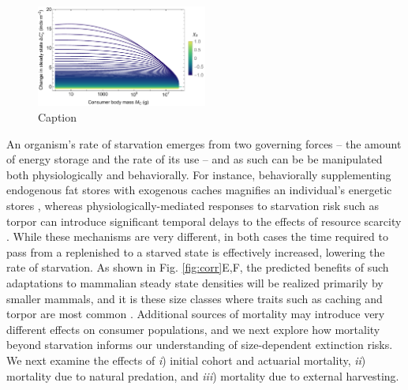 \documentclass[11pt]{article}
\begin{document}
\begin{figure}[h!]
    \centering
    \includegraphics[width=0.5\textwidth]{fig_starverelative.pdf}
    \caption{
    \footnotesize
    Caption}
    \label{fig:starve}
\end{figure}



An organism's rate of starvation emerges from two governing forces -- the amount of energy storage and the rate of its use -- and as such can be be manipulated both physiologically and behaviorally.
For instance, behaviorally supplementing endogenous fat stores with exogenous caches magnifies an individual's energetic stores \citep{yeakel2020caching}, whereas physiologically-mediated responses to starvation risk such as torpor can introduce significant temporal delays to the effects of resource scarcity \citep{schubert2010daily}.
While these mechanisms are very different, in both cases the time required to pass from a replenished to a starved state is effectively increased, lowering the rate of starvation.
As shown in Fig. \ref{fig:corr}E,F, the predicted benefits of such adaptations to mammalian steady state densities will be realized primarily by smaller mammals, and it is these size classes where traits such as caching and torpor are most common \citep{geiser1998evolution,smith1984evolution,yeakel2020caching}. 
Additional sources of mortality may introduce very different effects on consumer populations, and we next explore how mortality beyond starvation informs our understanding of size-dependent extinction risks.
We next examine the effects of \emph{i}) initial cohort and actuarial mortality, \emph{ii}) mortality due to natural predation, and \emph{iii}) mortality due to external harvesting.
\end{document}

